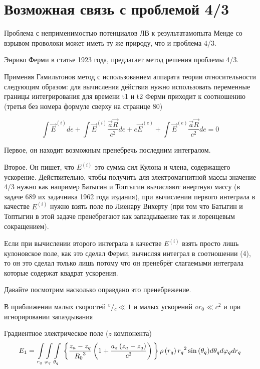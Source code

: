 \documentclass[12pt]{article}
\begin{document}
\section{Возможная связь с проблемой 4/3}

Проблема с неприменимостью потенциалов ЛВ к результатамопыта Менде со взрывом проволоки может иметь ту же природу, что и проблема 4/3.

Энрико Ферми в статье \cite{Fermi1923} 1923 года, 
предлагает метод решения проблемы 4/3.

Применяя Гамильтонов метод с использованием аппарата теории относительности следующим образом: для вычисления действия нужно использовать переменные границы интегрирования для времени t1 и t2 Ферми приходит к соотношению (третья без номера формуле сверху на странице 80)

$$\int \vec E^{(i)} de + \int \vec E^{(i)}\frac{\vec a \vec R}{c^2} de + e \vec E^{(e)} + \int \vec E^{(e)}\frac{\vec a \vec R}{c^2} de = 0$$

Первое, он находит возможным пренебречь последним интегралом.

Второе. Он пишет, что $E^{(i)}$ это сумма сил Кулона и члена, содержащего ускорение. Действительно, чтобы получить для электромагнитной массы значение 4/3 нужно как например Батыгин и Топтыгин вычисляют инертную массу (в задаче 689 их задачника 1962 года издания), при вычислении первого интеграла в качестве $E^{(i)}$ нужно взять поле по Лиенару Вихерту (при том что Батыгин и Топтыгин в этой задаче пренебрегают как запаздываение так и лоренцевым сокращением).

Если при вычислении второго интеграла в качестве $E^{(i)}$ взять просто лишь кулоновское поле, как это сделал Ферми, вычисляя интеграл в соотношении (4), то он это сделал только лишь потому что он пренебрёг слагаемыми интеграла которые содержат квадрат ускорения.

Давайте посмотрим насколько оправдано это пренебрежение.


В приближении малых скоростей ${}^{v} \big / {}_{c}\ll 1$  и малых ускорений $a{{r}_{0}}\ll {{c}^{2}}$ и при игнорировании запаздывания

Градиентное электрическое поле ($z$ компонента)
	\[{E}_{1}=\\
\int\limits_{{{r}_{q}}}\int\limits_{{{\varphi}_{q}}}\int\limits_{{{\theta}_{q}}}\\
\left\{ \frac{z_a-z_q}{{{R}_{0}}^3}\left( 1+\frac{a_z\left( {{z}_{a}}-{{z}_{q}} \right)}{c^2} \right) \\
 \right\}\\
{\rho \left( {{r}_{q}} \right){{r}_{q}}^{2}\sin \left( {{\theta }_{q}} \right)}\\
d{{\theta }_{q}}d{{\varphi }_{q}}d{{r}_{q}}\] 	
\end{document}
